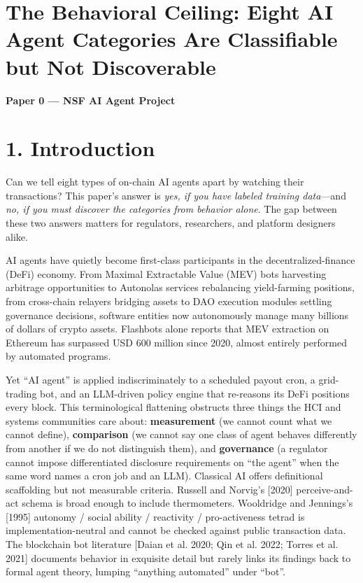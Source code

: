 \documentclass[sigconf,nonacm=false]{acmart}
\begin{document}

\maketitle

\section{The Behavioral Ceiling: Eight AI Agent Categories Are Classifiable but Not Discoverable}

\textbf{Paper 0 --- NSF AI Agent Project}



\section{1. Introduction}

Can we tell eight types of on-chain AI agents apart by watching their transactions? This paper's answer is \textit{yes, if you have labeled training data}---and \textit{no, if you must discover the categories from behavior alone}. The gap between these two answers matters for regulators, researchers, and platform designers alike.

AI agents have quietly become first-class participants in the decentralized-finance (DeFi) economy. From Maximal Extractable Value (MEV) bots harvesting arbitrage opportunities to Autonolas services rebalancing yield-farming positions, from cross-chain relayers bridging assets to DAO execution modules settling governance decisions, software entities now autonomously manage many billions of dollars of crypto assets. Flashbots alone reports that MEV extraction on Ethereum has surpassed USD 600 million since 2020, almost entirely performed by automated programs.

Yet ``AI agent'' is applied indiscriminately to a scheduled payout cron, a grid-trading bot, and an LLM-driven policy engine that re-reasons its DeFi positions every block. This terminological flattening obstructs three things the HCI and systems communities care about: \textbf{measurement} (we cannot count what we cannot define), \textbf{comparison} (we cannot say one class of agent behaves differently from another if we do not distinguish them), and \textbf{governance} (a regulator cannot impose differentiated disclosure requirements on ``the agent'' when the same word names a cron job and an LLM). Classical AI offers definitional scaffolding but not measurable criteria. Russell and Norvig's [2020] perceive-and-act schema is broad enough to include thermometers. Wooldridge and Jennings's [1995] autonomy / social ability / reactivity / pro-activeness tetrad is implementation-neutral and cannot be checked against public transaction data. The blockchain bot literature [Daian et al. 2020; Qin et al. 2022; Torres et al. 2021] documents behavior in exquisite detail but rarely links its findings back to formal agent theory, lumping ``anything automated'' under ``bot''.
\end{document}
